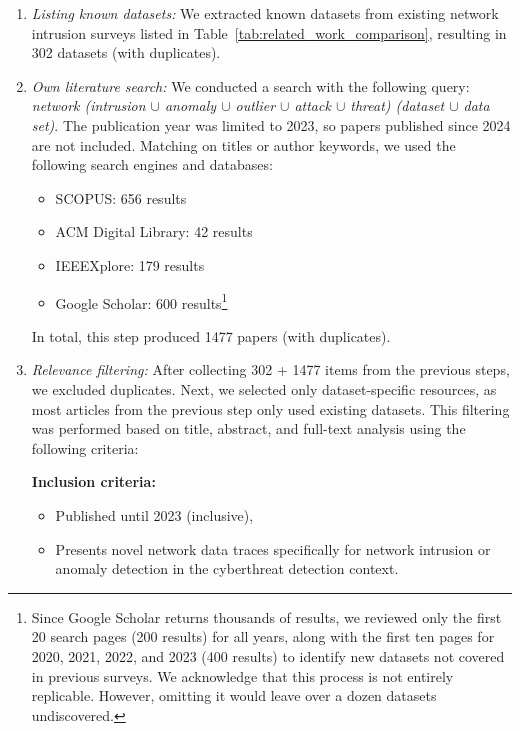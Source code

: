 \begin{enumerate}[topsep=2pt]
    \item \emph{Listing known datasets:} We extracted known datasets from existing network intrusion surveys listed in Table~\ref{tab:related_work_comparison}, resulting in 302 datasets (with duplicates).

    \item \emph{Own literature search:} We conducted a search with the following query: \textit{network (intrusion $\cup$ anomaly $\cup$ outlier $\cup$ attack $\cup$ threat) (dataset $\cup$ data\,set)}. The publication year was limited to 2023, so papers published since 2024 are not included. Matching on titles or author keywords, we used the following search engines and databases:
    
    \begin{itemize}[topsep=1pt, itemsep=1pt]
        \item SCOPUS: 656 results
        \item ACM Digital Library: 42 results
        \item IEEEXplore: 179 results
        \item Google Scholar: 600 results\footnote{Since Google Scholar returns thousands of results, we reviewed only the first 20 search pages (200 results) for all years, along with the first ten pages for 2020, 2021, 2022, and 2023 (400 results) to identify new datasets not covered in previous surveys. We acknowledge that this process is not entirely replicable. However, omitting it would leave over a dozen datasets undiscovered.}
    \end{itemize}
    
    \noindent In total, this step produced 1477 papers (with duplicates).

    \item \emph{Relevance filtering:} After collecting 302 + 1477 items from the previous steps, we excluded duplicates. Next, we selected only dataset-specific resources, as most articles from the previous step only used existing datasets. This filtering was performed based on title, abstract, and full-text analysis using the following criteria:

\noindent \textbf{Inclusion criteria:}
\begin{itemize}[topsep=1pt, itemsep=3pt, parsep=0pt]
    \item Published until 2023 (inclusive),
    \item Presents novel network data traces specifically for network intrusion or anomaly detection in the cyberthreat detection context.
\end{itemize}


\end{enumerate}
